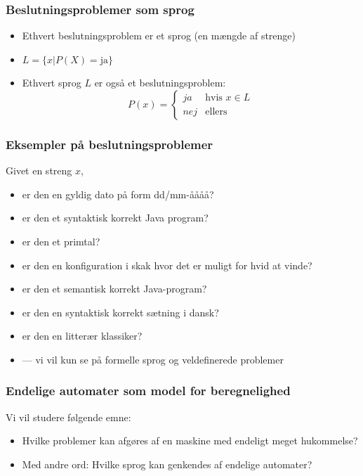 \documentclass[]{beamer}
\begin{document}
\begin{frame}
\frametitle{Beslutningsproblemer som sprog}
\begin{itemize}[<+->]
\item Ethvert beslutningsproblem er et sprog (en mængde af strenge)
\item $L = \{ x | P(X) = \text{ja} \}$
\item Ethvert sprog $L$ er også et beslutningsproblem: 
\[P(x) = 
\begin{cases}
ja & \text{hvis } x ∈ L \\
nej & \text{ellers }
\end{cases}
\]
\end{itemize}
\end{frame}

\begin{frame}
\frametitle{Eksempler på beslutningsproblemer}
{\large Givet en streng $x$,}
\begin{itemize}
\item er den en gyldig dato på form dd/mm-åååå?
\item er den et syntaktisk korrekt Java program?
\item er den et primtal?
\item er den en konfiguration i skak hvor det er muligt for hvid at
  vinde?
\item er den et semantisk korrekt Java-program?
\item er den en syntaktisk korrekt sætning i dansk?
\item er den en litterær klassiker?
\item — vi vil kun se på formelle sprog og veldefinerede problemer
\end{itemize}
\end{frame}

\begin{frame}
\frametitle{Endelige automater som model for beregnelighed}
Vi vil studere følgende emne:
\begin{itemize}
\item Hvilke problemer kan afgøres af en maskine 
med endeligt meget hukommelse?
\item Med andre ord:
Hvilke sprog kan genkendes af 
endelige automater?
\end{itemize}
\end{frame}
\end{document}

